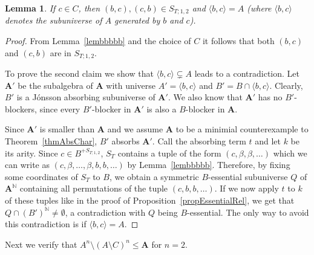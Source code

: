 \documentclass{amsart}
\theoremstyle{plain}
\newtheorem{lemma}[theorem]{Lemma}
\theoremstyle{definition}
\begin{document}
\begin{lemma}\label{lemcinB}
    If $c\in C$, then $(b,c),(c,b)\in S_{T;1,2}$ and $\langle b,c \rangle = A$ (where $\langle b,c \rangle$ denotes the subuniverse of $A$ generated by $b$ and $c$).
\end{lemma}

\begin{proof}
From Lemma~\ref{lembbbbb} and the choice of $C$ it follows that both $(b,c)$ and $(c,b)$ are in $S_{T;1,2}$. 

To prove the second claim we show that $\langle b,c\rangle \subsetneq A$ leads
to a contradiction. Let ${{\mathbf{A}}}'$ be the subalgebra of ${{\mathbf{A}}}$ with universe $A' = \langle b,c \rangle$ and
$B' = B \cap \langle b,c \rangle$. Clearly, $B'$ is a J\'onsson absorbing
subuniverse of ${{\mathbf{A}}}'$. We also know that ${{\mathbf{A}}}'$ has no $B'$-blockers, since
every $B'$-blocker in ${{\mathbf{A}}}'$ is also a $B$-blocker in ${{\mathbf{A}}}$.

Since ${{\mathbf{A}}}'$ is smaller than ${{\mathbf{A}}}$ and we assume ${{\mathbf{A}}}$ to be a minimial counterexample
to Theorem~\ref{thmAbsChar}, $B'$ absorbs ${{\mathbf{A}}}'$. Call the absorbing term $t$ and let $k$ be its arity.
Since $c \in
B^{+S_{T;1,2}}$, $S_T$ contains a tuple of the form
$(c,\beta,\beta,\dots)$ which we can write as $(c,\beta,\dots,\beta,b,b,\dots)$
by Lemma~\ref{lembbbbb}. Therefore, by fixing some coordinates of $S_T$ to $B$,
we obtain a symmetric $B$-essential subuniverse $Q$ of ${{\mathbf{A}}}^{{\mathbb N}}$ containing
all permutations of the tuple $(c,b,b,\dots)$. If we now apply $t$ to $k$ of these
tuples like in the proof of Proposition~\ref{propEssentialRel}, we get that
$Q\cap (B')^{{\mathbb N}}\neq \emptyset$, a contradiction with $Q$ being $B$-essential.
The only way to avoid this contradiction is if $\langle b,c\rangle =A$.
\end{proof}

Next we verify that $A^n\setminus (A\setminus C)^n\leq {{\mathbf{A}}}$ for $n=2$.
\end{document}
